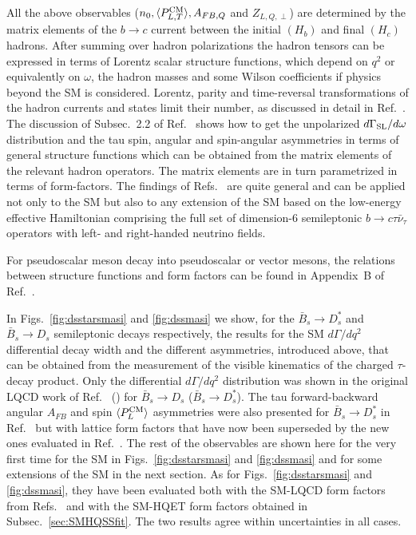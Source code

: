 \documentclass[aps,superscriptaddress,showpacs,nofootinbib,11pt]{revtex4-1}
\begin{document}
 All the above observables ($n_0,\langle P^{\rm CM}_{L,T}\rangle, A_{FB,Q}$ and $ Z_{L,Q,\perp}$) are determined by the matrix elements of the $b\to c$ current between the initial $(H_b)$ and final $(H_c)$ hadrons. After summing over hadron polarizations the hadron tensors can be expressed  in terms of  Lorentz scalar  structure functions, which depend on $q^2$ or equivalently on $\omega$, the hadron masses and some   Wilson coefficients if physics beyond the SM is considered.  Lorentz, parity and time-reversal  transformations of the hadron currents and states limit their number, as  discussed in detail in Ref.~\cite{Penalva:2020xup}. The discussion of Subsec.\ 2.2  of Ref.~\cite{Penalva:2021wye} shows how to get the unpolarized $d\Gamma_{\rm SL}/d\omega$ distribution and the tau spin, angular and spin-angular asymmetries in terms of general structure functions which can be obtained from the matrix elements of the relevant hadron operators. The matrix elements are in turn parametrized in terms of form-factors. The findings of Refs.~\cite{Penalva:2020xup,Penalva:2021wye} are quite general and can be applied not only to the SM but also to any extension  of the SM based on the low-energy effective Hamiltonian comprising the full set of dimension-6 semileptonic $b\to c \tau \bar\nu_\tau$ operators with left- and right-handed neutrino fields.

For pseudoscalar meson decay into pseudoscalar or vector mesons, the relations between structure functions and form factors can be found in Appendix~B of Ref.~\cite{Penalva:2020ftd}. 

In Figs.~\ref{fig:dsstarsmasi} and \ref{fig:dssmasi} we show, for the
$\bar B_s\to D_s^*$ and $\bar B_s\to D_s$ semileptonic decays respectively, the results for the SM $d\Gamma/dq^2$ differential decay width and the different asymmetries, introduced above, that can be obtained from the measurement of the visible kinematics of the charged $\tau$-decay product.  
Only the differential $d\Gamma/dq^2$ distribution was shown in the original LQCD work of Ref.~\cite{McLean:2019qcx} (\cite{Harrison:2023dzh}) for $\bar B_s \to D_s$ ($\bar B_s \to D^*_s$). The tau forward-backward angular $A_{FB}$ and spin  $\langle P^{\rm CM}_L\rangle$ asymmetries were also presented for $\bar B_s \to D^*_s$ in Ref.~\cite{Harrison:2021tol} but with lattice form factors that have now been  superseded by the new ones evaluated in Ref.~\cite{Harrison:2023dzh}. 
The rest of the observables are shown here for the very first time for the SM in Figs.~\ref{fig:dsstarsmasi} and \ref{fig:dssmasi} and for some extensions of the SM in the next section. As for Figs.~\ref{fig:dsstarsmasi} and \ref{fig:dssmasi}, they have been evaluated both with the SM-LQCD form factors from 
Refs.~\cite{Harrison:2021tol,McLean:2019qcx} and  with the SM-HQET form factors obtained in Subsec.~\ref{sec:SMHQSSfit}. The two results  agree within uncertainties in all cases. 
\end{document}
